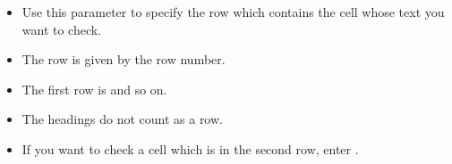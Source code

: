   \begin{itemize}
\item Use this parameter to specify the row which contains the cell whose text you want to check.
\item The row is given by the row number.
\item The first row is  and so on.
\item The headings do not count as a row. 
\item If you want to check a cell which is in the second row, enter . 
\end{itemize}    